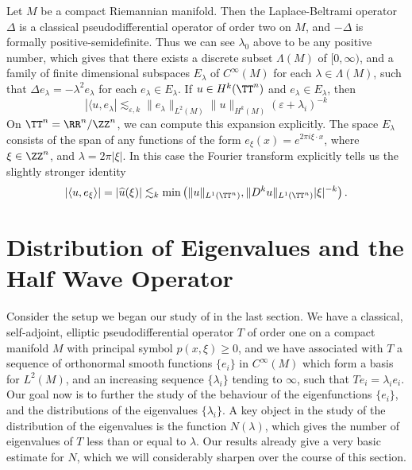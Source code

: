 \begin{example}
    Let $M$ be a compact Riemannian manifold. Then the Laplace-Beltrami operator $\Delta$ is a classical pseudodifferential operator of order two on $M$, and $-\Delta$ is formally positive-semidefinite. Thus we can see $\lambda_0$ above to be any positive number, which gives that there exists a discrete subset $\Lambda(M)$ of $[0,\infty)$, and a family of finite dimensional subspaces $E_\lambda$ of $C^\infty(M)$ for each $\lambda \in \Lambda(M)$, such that $\Delta e_\lambda = - \lambda^2 e_\lambda$ for each $e_\lambda \in E_\lambda$. If $u \in H^k(\TT^n)$ and $e_\lambda \in E_\lambda$, then
    \[ |\langle u, e_\lambda| \lesssim_{\varepsilon,k} \| e_\lambda \|_{L^2(M)} \| u \|_{H^k(M)} (\varepsilon + \lambda_i)^{-k} \]
    On $\TT^n = \RR^n / \ZZ^n$, we can compute this expansion explicitly. The space $E_\lambda$ consists of the span of any functions of the form $e_\xi(x) = e^{2 \pi i \xi \cdot x}$, where $\xi \in \ZZ^n$, and $\lambda = 2 \pi |\xi|$. In this case the Fourier transform explicitly tells us the slightly stronger identity
    \[ |\langle u, e_\xi \rangle| = |\widehat{u}(\xi)| \lesssim_k \min \left( \| u \|_{L^1(\TT^n)}, \| D^k u \|_{L^1(\TT^n)} |\xi|^{-k} \right). \]
\end{example}







\chapter{Distribution of Eigenvalues and the Half Wave Operator}

Consider the setup we began our study of in the last section. We have a classical, self-adjoint, elliptic pseudodifferential operator $T$ of order one on a compact manifold $M$ with principal symbol $p(x,\xi) \geq 0$, and we have associated with $T$ a sequence of orthonormal smooth functions $\{ e_i \}$ in $C^\infty(M)$ which form a basis for $L^2(M)$, and an increasing sequence $\{ \lambda_i \}$ tending to $\infty$, such that $Te_i = \lambda_i e_i$. Our goal now is to further the study of the behaviour of the eigenfunctions $\{ e_i \}$, and the distributions of the eigenvalues $\{ \lambda_i \}$. A key object in the study of the distribution of the eigenvalues is the function $N(\lambda)$, which gives the number of eigenvalues of $T$ less than or equal to $\lambda$. Our results already give a very basic estimate for $N$, which we will considerably sharpen over the course of this section.

